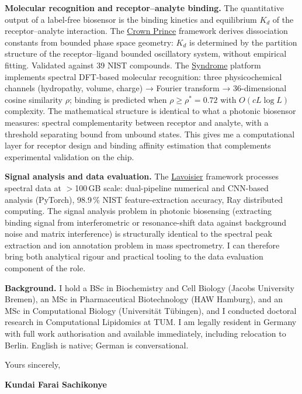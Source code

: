 \documentclass[12pt,a4paper]{article}
\begin{document}
\textbf{Molecular recognition and receptor--analyte binding.}
The quantitative output of a label-free biosensor is the binding kinetics
and equilibrium $K_d$ of the receptor--analyte interaction.
The \href{https://github.com/fullscreen-triangle/crown-prince}{Crown Prince}
framework derives dissociation constants from bounded phase space geometry:
$K_d$ is determined by the partition structure of the receptor--ligand
bounded oscillatory system, without empirical fitting.
Validated against 39 NIST compounds.
The \href{https://syndrome-seven.vercel.app/tools/mhc-binding}{Syndrome}
platform implements spectral DFT-based molecular recognition: three
physicochemical channels (hydropathy, volume, charge) → Fourier transform
→ 36-dimensional cosine similarity $\rho$; binding is predicted when
$\rho \geq \rho^* = 0.72$ with $O(cL\log L)$ complexity.
The mathematical structure is identical to what a photonic biosensor measures:
spectral complementarity between receptor and analyte, with a threshold
separating bound from unbound states.
This gives me a computational layer for receptor design and binding affinity
estimation that complements experimental validation on the chip.

\textbf{Signal analysis and data evaluation.}
The \href{https://github.com/fullscreen-triangle/lavoisier}{Lavoisier}
framework processes spectral data at $>$100\,GB scale: dual-pipeline numerical
and CNN-based analysis (PyTorch), 98.9\,\% NIST feature-extraction accuracy,
Ray distributed computing. The signal analysis problem in photonic biosensing
(extracting binding signal from interferometric or resonance-shift data against
background noise and matrix interference) is structurally identical to the
spectral peak extraction and ion annotation problem in mass spectrometry.
I can therefore bring both analytical rigour and practical tooling to the
data evaluation component of the role.

\textbf{Background.}
I hold a BSc in Biochemistry and Cell Biology (Jacobs University Bremen),
an MSc in Pharmaceutical Biotechnology (HAW Hamburg), and an MSc in
Computational Biology (Universität Tübingen), and I conducted doctoral
research in Computational Lipidomics at TUM.
I am legally resident in Germany with full work authorisation and available
immediately, including relocation to Berlin.
English is native; German is conversational.

\vspace{1.5em}
Yours sincerely,

\vspace{2.5em}
\textbf{Kundai Farai Sachikonye}
\end{document}
